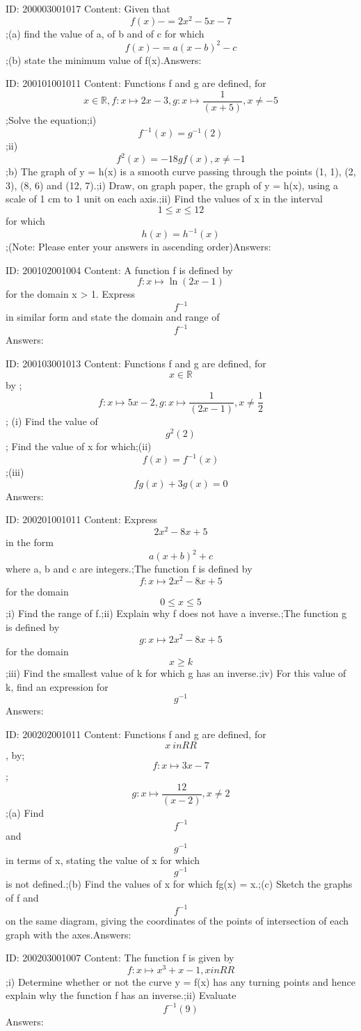 \documentclass{article}
\begin{document}
ID: 200003001017
Content:
Given that \[f(x)-=2x^2-5x-7\];(a)	find the value of a, of b and of c for which \[f(x)-=a(x-b)^2-c\];(b)	state the minimum value of f(x).Answers:

ID: 200101001011
Content:
Functions f and g are defined, for \[x\in \mathbb{R},f:x \mapsto 2x-3,g:x \mapsto\frac{1}{(x+5)},x\neq-5\] ;Solve the equation;i) \[f^{-1}(x)=g^{-1}(2)\] ;ii) \[f^2(x)=-18gf(x),x\neq-1\] ;b) The graph of y = h(x) is a smooth curve passing through the points (1, 1), (2, 3), (8, 6) and (12, 7).;i) Draw, on graph paper, the graph of y = h(x), using a scale of 1 cm to 1 unit on each axis.;ii) Find the values of x in the interval \[1\leq x\leq 12\] for which \[h(x)=h^{-1}(x)\];(Note: Please enter your answers in ascending order)Answers:

ID: 200102001004
Content:
A function f is defined by \[f:x \mapsto \ln(2x-1)\]for the domain x > 1. Express \[f^{-1}\] in similar form and state the domain and range of \[f^{-1}\]Answers:

ID: 200103001013
Content:
Functions f and g are defined, for \[x\in \mathbb{R}\] by ; \[f:x \mapsto 5x-2,g:x \mapsto \frac{1}{(2x-1)}, x\neq\frac{1}{2}\]; (i) Find the value of \[g^2(2)\]; Find the value of x for which;(ii) \[f(x)=f^{-1}(x)\];(iii) \[fg(x) + 3g(x) = 0\]Answers:

ID: 200201001011
Content:
Express $$2x^2-8x+5$$ in the form $$a(x+b)^2+c$$ where a, b and c are integers.;The function f is defined by $$f: x \mapsto2x^2-8x+5$$ for the domain $$0\leq x\leq 5$$;i) Find the range of f.;ii) Explain why f does not have a inverse.;The function g is defined by $$g: x \mapsto2x ^2-8x+5$$ for the domain $$x\geq k$$;iii) Find the smallest value of k for which g has an inverse.;iv) For this value of k, find an expression for $$g^{-1}$$Answers:

ID: 200202001011
Content:
Functions f and g are defined, for $$x\ in RR$$, by;$$f: x \mapsto3x-7$$;$$g: x \mapsto \frac{12}{(x-2)},x\neq2$$;(a) Find $$f^{-1}$$ and $$g^{-1}$$ in terms of x, stating the value of x for which $$g^{-1}$$ is not defined.;(b) Find the values of x for which fg(x) = x.;(c) Sketch the graphs of f and $$f^{-1}$$ on the same diagram, giving the coordinates of the points of intersection of each graph with the axes.Answers:

ID: 200203001007
Content:
The function f is given by $$f:x\mapsto x^3+x-1, x in RR$$;i) Determine whether or not the curve y = f(x) has any turning points and hence explain why the function f has an inverse.;ii) Evaluate $$f^{-1}(9)$$Answers:
\end{document}
